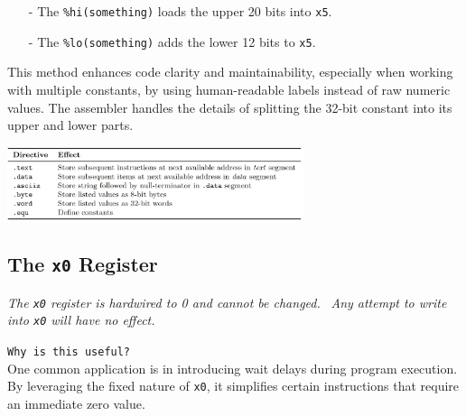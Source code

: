 \begin{itemize}
    \item[-] The \texttt{\%hi(something)} loads the upper 20 bits into \texttt{x5}.
    \item[-] The \texttt{\%lo(something)} adds the lower 12 bits to \texttt{x5}.
\end{itemize}

This method enhances code clarity and maintainability, especially when working with multiple constants, by using human-readable labels instead of raw numeric values. The assembler handles the details of splitting the 32-bit constant into its upper and lower parts.
\begin{center} \includegraphics[width=0.65\textwidth]{chapters/chapter1b/images/directives2.png} \end{center}

\subsection{The \texttt{x0} Register} 
\textit{The \texttt{x0} register is hardwired to 0 and cannot be changed.} \ \textit{Any attempt to write into \texttt{x0} will have no effect.}

\texttt{Why is this useful?} \\
One common application is in introducing wait delays during program execution. By leveraging the fixed nature of \texttt{x0}, it simplifies certain instructions that require an immediate zero value.

